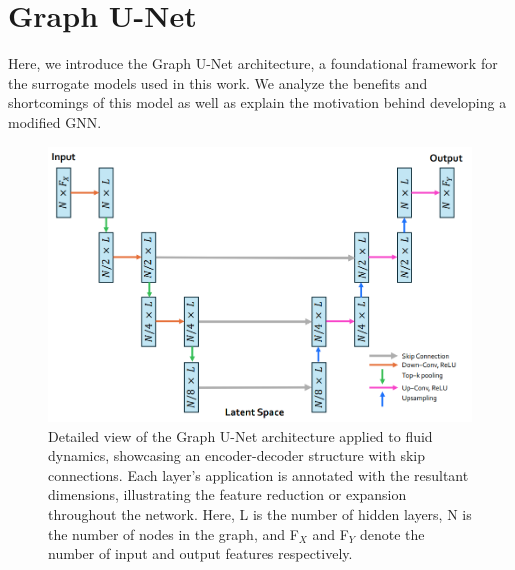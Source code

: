 \section{Graph U-Net}
Here, we introduce the Graph U-Net architecture, a foundational framework for the surrogate models used in this work. We analyze the benefits and shortcomings of this model as well as explain the motivation behind developing a modified GNN.
\begin{figure}[ht]
    \centering
    \includegraphics[width=12cm]{images/Methodology/GraphUNet.png}
    \caption{Detailed view of the Graph U-Net architecture applied to fluid dynamics, showcasing an encoder-decoder structure with skip connections. Each layer’s application is annotated with the resultant dimensions, illustrating the feature reduction or expansion throughout the network. Here, L is the number of hidden layers, N is the number of nodes in the graph, and F$_X$ and F$_Y$ denote the number of input and output features respectively.}
    \label{fig:GraphUnet}
\end{figure}

